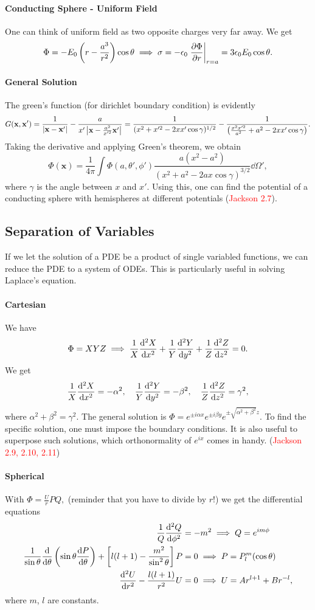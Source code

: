 \documentclass{article}
\begin{document}
\paragraph{Conducting Sphere - Uniform Field}
One can think of uniform field as two opposite charges very far away. We get
$$\Phi=-E_0\left(r-\frac{a^3}{r^2}\right)\cos\theta\implies\sigma=-\epsilon_0\left. \frac{\partial \Phi}{\partial r}\right|_{r=a}=3\epsilon_0E_0\cos\theta.$$

\paragraph{General Solution}
The green's function (for dirichlet boundary condition) is evidently 
$$G(\mathbf x,\mathbf x')=\frac 1{\left\lvert\mathbf x-\mathbf x'\right\rvert}-\frac a{x'\left\lvert\mathbf x-\frac{a^2}{x'^2}\mathbf x'\right\rvert}=\frac 1{(x^2+x'^2-2xx'\cos\gamma)^{1/2}}-\frac 1{\left(\frac{x^2x'^2}{a^2}+a^2-2xx'\cos\gamma\right)}.$$
Taking the derivative and applying Green's theorem, we obtain
$$\Phi(\mathbf x)=\frac 1{4\pi}\int\Phi(a,\theta',\phi')\frac{a(x^2-a^2)}{(x^2+a^2-2ax\cos\gamma)^{3/2}}\dd\Omega',$$
where $\gamma$ is the angle between $x$ and $x'$.
Using this, one can find the potential of a conducting sphere with hemispheres at different potentials (\textcolor{red}{Jackson 2.7}).


\subsection{Separation of Variables}
If we let the solution of a PDE be a product of single variabled functions, we can reduce the PDE to a system of ODEs. This is particularly useful in solving Laplace's equation.

\paragraph{Cartesian}
We have 
$$\Phi=XYZ\implies \frac 1X\frac{\mathrm{d}^{2}X}{\mathrm{d}{x}^{2}}+\frac 1Y\frac{\mathrm{d}^{2}Y}{\mathrm{d}{y}^{2}}+\frac 1Z\frac{\mathrm{d}^{2}Z}{\mathrm{d}{z}^{2}}=0.$$
We get 
$$\frac 1X\frac{\mathrm{d}^{2}X}{\mathrm{d}{x}^{2}}=-\alpha^2,\quad \frac 1Y\frac{\mathrm{d}^{2}Y}{\mathrm{d}{y}^{2}}=-\beta^2,\quad \frac 1Z\frac{\mathrm{d}^{2}Z}{\mathrm{d}{z}^{2}}=\gamma^2,$$
where $\alpha^2+\beta^2=\gamma^2.$ The general solution is $\Phi=e^{\pm i\alpha x}e^{\pm i\beta y}e^{\pm\sqrt{\alpha^2+\beta^2}z}.$ 
To find the specific solution, one must impose the boundary conditions. It is also useful to superpose such solutions, which orthonormality of $e^{ix}$ comes in handy. (\textcolor{red}{Jackson 2.9, 2.10, 2.11})

\paragraph{Spherical}
With $\Phi=\frac UrPQ,$ (reminder that you have to divide by $r$!) we get the differential equations
\begin{align*}
    \frac 1Q\frac{\mathrm{d}^{2}Q}{\mathrm{d}{\phi}^{2}}&=-m^2\implies Q=e^{im\phi}\\
    \frac 1{\sin\theta}\frac{\mathrm{d}}{\mathrm{d}\theta}\left(\sin\theta\frac{\mathrm{d}P}{\mathrm{d}\theta}\right)+\left[l(l+1)-\frac{m^2}{\sin^2\theta}\right]P&=0\implies P = P^m_l(\cos\theta)\\
    \frac{\mathrm{d}^{2}U}{\mathrm{d}{r}^{2}}-\frac{l(l+1)}{r^2}U&=0\implies U=Ar^{l+1}+Br^{-l},
\end{align*}
where $m$, $l$ are constants.
\end{document}
